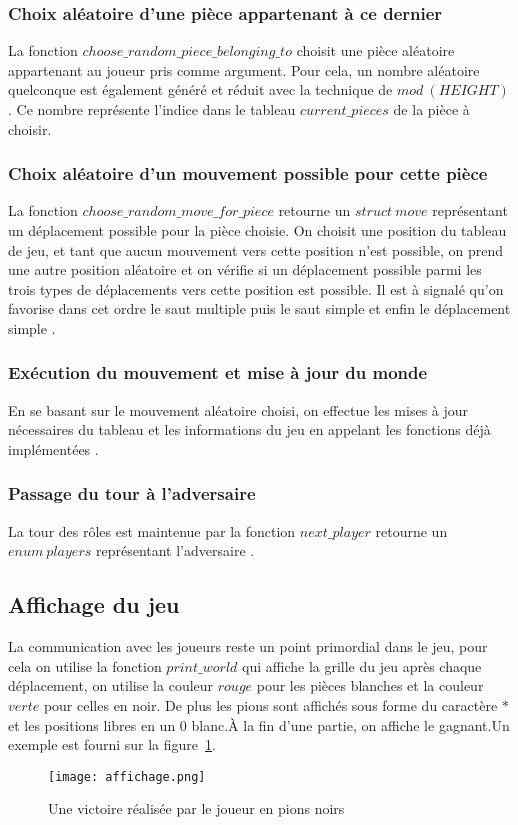 \documentclass[11pt]{article}
\begin{document}
            \subsubsection*{Choix aléatoire d'une pièce appartenant à ce dernier }
                La fonction $choose\_random\_piece\_belonging\_to$ choisit une pièce aléatoire appartenant au joueur pris comme argument. Pour cela, un nombre aléatoire quelconque est également généré et réduit avec la technique de $mod\ (HEIGHT)$ . Ce nombre représente l'indice dans le tableau $current\_pieces$ de la pièce à choisir.
            
            \subsubsection*{Choix aléatoire d'un mouvement possible pour cette pièce}
                La fonction $choose\_random\_move\_for\_piece$ retourne un $struct\ move$ représentant un déplacement possible pour la pièce choisie. On choisit une position du tableau de jeu, et tant que aucun mouvement vers cette position n'est possible, on prend une autre position aléatoire et on vérifie si un déplacement possible parmi les trois types de déplacements vers cette position est possible. Il est à signalé qu'on favorise dans cet ordre le saut multiple puis le saut simple et enfin le déplacement simple .   
            \subsubsection*{Exécution du mouvement et mise à jour du monde}
                En se basant sur le mouvement aléatoire choisi, on effectue les mises à jour nécessaires du tableau et les informations du jeu en appelant les fonctions déjà implémentées .
            \subsubsection*{Passage du tour à l'adversaire}
                La tour des rôles est maintenue par la fonction $next\_player$ retourne un $enum \ players$ représentant l'adversaire .
        \subsection{Affichage du jeu}
                 La communication avec les joueurs reste un point primordial dans le jeu, pour cela on utilise la fonction $print\_world$ qui affiche la grille du jeu après chaque déplacement, on utilise la couleur $rouge$ pour les pièces blanches et la couleur $verte$ pour celles en noir. De plus les pions sont affichés sous forme du caractère $*$ et les positions libres en un $0$ blanc.À la fin d'une partie, on affiche le gagnant.Un exemple est fourni sur la figure~\ref{figure22}. 
                 \begin{figure}[h]
                                \centering
                                \texttt{[image: affichage.png]}
                                \caption{ Une victoire réalisée par le joueur en pions noirs }
                                \label{figure22}
                                \end{figure}
            \newpage
\end{document}
